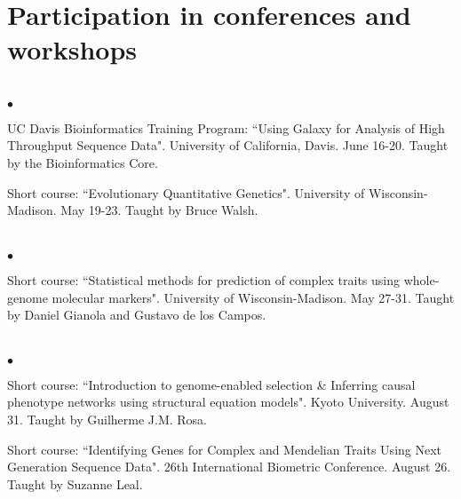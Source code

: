 \documentclass[margin,line,10pt]{res}
\newenvironment{list2}{
  \begin{list}{$\bullet$}{%
      \setlength{\itemsep}{0in}
      \setlength{\parsep}{0in} \setlength{\parskip}{0in}
      \setlength{\topsep}{0in} \setlength{\partopsep}{0in} 
      \setlength{\leftmargin}{0.2in}}}{\end{list}}
\begin{document}
\begin{resume}
\vspace{0.5cm}
\section{\sc Participation in conferences and workshops} 
\vspace{2cm}


\section{}
\begin{list2}

\item UC Davis Bioinformatics Training Program: 
``Using Galaxy for Analysis of High Throughput Sequence Data". University of California, Davis. June 16-20. 
Taught by the Bioinformatics Core. 

\vspace{0.5cm}

\item Short course: ``Evolutionary Quantitative Genetics". University of Wisconsin-Madison. May 19-23. 
Taught by Bruce Walsh. 

\end{list2}  


\section{}
\begin{list2}
\item Short course: ``Statistical methods for prediction of complex traits using whole-genome molecular markers". University of Wisconsin-Madison. May 27-31. 
Taught by Daniel Gianola and Gustavo de los Campos.
\end{list2}  

\section{}
\begin{list2}
\item Short course: ``Introduction to genome-enabled selection \& Inferring causal phenotype networks using structural equation models". 
Kyoto University. August 31. Taught by Guilherme J.M. Rosa. 

\vspace{0.5cm}

\item Short course: ``Identifying Genes for Complex and Mendelian Traits Using Next Generation Sequence Data". 26th International Biometric Conference. August 26. Taught by Suzanne Leal.  


\end{list2}
\end{resume}
\end{document}
